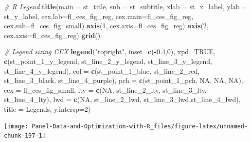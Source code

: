 \documentclass[
]{book}
\newenvironment{Shaded}{\begin{snugshade}}{\end{snugshade}}
\newcommand{\CommentTok}[1]{\textcolor[rgb]{0.56,0.35,0.01}{\textit{#1}}}
\newcommand{\DataTypeTok}[1]{\textcolor[rgb]{0.13,0.29,0.53}{#1}}
\newcommand{\DecValTok}[1]{\textcolor[rgb]{0.00,0.00,0.81}{#1}}
\newcommand{\FloatTok}[1]{\textcolor[rgb]{0.00,0.00,0.81}{#1}}
\newcommand{\KeywordTok}[1]{\textcolor[rgb]{0.13,0.29,0.53}{\textbf{#1}}}
\newcommand{\NormalTok}[1]{#1}
\newcommand{\OperatorTok}[1]{\textcolor[rgb]{0.81,0.36,0.00}{\textbf{#1}}}
\newcommand{\OtherTok}[1]{\textcolor[rgb]{0.56,0.35,0.01}{#1}}
\newcommand{\StringTok}[1]{\textcolor[rgb]{0.31,0.60,0.02}{#1}}
\begin{document}
\begin{Shaded}
\begin{Highlighting}[]
\CommentTok{\# R Legend}
\KeywordTok{title}\NormalTok{(}\DataTypeTok{main =}\NormalTok{ st\_title, }\DataTypeTok{sub =}\NormalTok{ st\_subtitle, }\DataTypeTok{xlab =}\NormalTok{ st\_x\_label, }\DataTypeTok{ylab =}\NormalTok{ st\_y\_label,}
      \DataTypeTok{cex.lab=}\NormalTok{fl\_ces\_fig\_reg,}
      \DataTypeTok{cex.main=}\NormalTok{fl\_ces\_fig\_reg,}
      \DataTypeTok{cex.sub=}\NormalTok{fl\_ces\_fig\_small)}
\KeywordTok{axis}\NormalTok{(}\DecValTok{1}\NormalTok{, }\DataTypeTok{cex.axis=}\NormalTok{fl\_ces\_fig\_reg)}
\KeywordTok{axis}\NormalTok{(}\DecValTok{2}\NormalTok{, }\DataTypeTok{cex.axis=}\NormalTok{fl\_ces\_fig\_reg)}
\KeywordTok{grid}\NormalTok{()}

\CommentTok{\# Legend sizing CEX}
\KeywordTok{legend}\NormalTok{(}\StringTok{"topright"}\NormalTok{,}
       \DataTypeTok{inset=}\KeywordTok{c}\NormalTok{(}\OperatorTok{{-}}\FloatTok{0.4}\NormalTok{,}\DecValTok{0}\NormalTok{),}
       \DataTypeTok{xpd=}\OtherTok{TRUE}\NormalTok{,}
       \KeywordTok{c}\NormalTok{(st\_point\_}\DecValTok{1}\NormalTok{\_y\_legend, st\_line\_}\DecValTok{2}\NormalTok{\_y\_legend, st\_line\_}\DecValTok{3}\NormalTok{\_y\_legend, st\_line\_}\DecValTok{4}\NormalTok{\_y\_legend),}
       \DataTypeTok{col =} \KeywordTok{c}\NormalTok{(st\_point\_}\DecValTok{1}\NormalTok{\_blue, st\_line\_}\DecValTok{2}\NormalTok{\_red, st\_line\_}\DecValTok{3}\NormalTok{\_black, st\_line\_}\DecValTok{4}\NormalTok{\_purple),}
       \DataTypeTok{pch =} \KeywordTok{c}\NormalTok{(st\_point\_}\DecValTok{1}\NormalTok{\_pch, }\OtherTok{NA}\NormalTok{, }\OtherTok{NA}\NormalTok{, }\OtherTok{NA}\NormalTok{),}
       \DataTypeTok{cex =}\NormalTok{ fl\_ces\_fig\_small,}
       \DataTypeTok{lty =} \KeywordTok{c}\NormalTok{(}\OtherTok{NA}\NormalTok{, st\_line\_}\DecValTok{2}\NormalTok{\_lty, st\_line\_}\DecValTok{3}\NormalTok{\_lty, st\_line\_}\DecValTok{4}\NormalTok{\_lty),}
       \DataTypeTok{lwd =} \KeywordTok{c}\NormalTok{(}\OtherTok{NA}\NormalTok{, st\_line\_}\DecValTok{2}\NormalTok{\_lwd, st\_line\_}\DecValTok{3}\NormalTok{\_lwd,st\_line\_}\DecValTok{4}\NormalTok{\_lwd),}
       \DataTypeTok{title =} \StringTok{\textquotesingle{}Legends\textquotesingle{}}\NormalTok{,}
       \DataTypeTok{y.intersp=}\DecValTok{2}\NormalTok{)}
\end{Highlighting}
\end{Shaded}

\begin{center}\texttt{[image: Panel-Data-and-Optimization-with-R\_files/figure-latex/unnamed-chunk-197-1]} \end{center}
\end{document}
